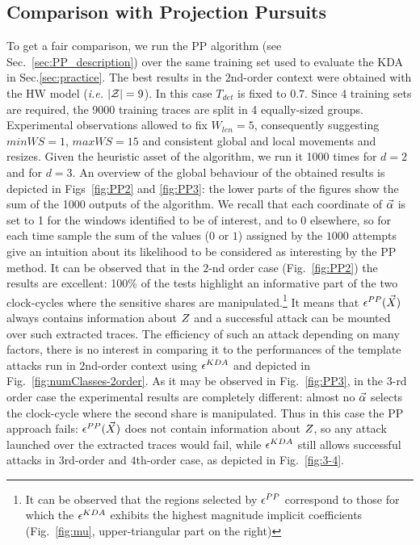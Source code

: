 

\subsection{Comparison with Projection Pursuits}\label{sec:comparisonPP}

To get a fair comparison, we run the PP algorithm (see Sec.~\ref{sec:PP_description}) over the same training set used to evaluate the KDA in Sec.\ref{sec:practice}. The best results in the $2$nd-order context were obtained with the HW model (\emph{i.e.}  $\lvert \mathcal{Z} \rvert=9$). In this case $T_{det}$ is fixed to $0.7$. Since 4 training sets are required, the 9000 training traces are split in 4 equally-sized groups.  Experimental observations allowed to fix  $W_{len}=5$, consequently suggesting $minWS=1$, $maxWS = 15$ and consistent global and local movements and resizes.
 Given the heuristic asset of the algorithm, we run it 1000 times for $d=2$ and for $d=3$. An overview of the global behaviour of the obtained results is depicted in Figs~\ref{fig:PP2} and \ref{fig:PP3}: the lower parts of the figures show the sum of the 1000 outputs of the algorithm.
  We recall that each coordinate of $\vec{\alpha}$ is set to 1 for the windows identified to be of interest, and to 0 elsewhere, so for each time sample the sum of the values ($0$ or $1$) assigned by the $1000$ attempts give an intuition about its likelihood to be considered as interesting by the PP method. It can be observed that in the $2$-nd order case (Fig.~\ref{fig:PP2}) the results are excellent: 100\% of the tests highlight an informative part of the two clock-cycles where the sensitive shares are manipulated.\footnote{It can be observed that the regions selected by $\epsilon^{PP}$ correspond to those for which the $\epsilon^{KDA}$ exhibits the highest magnitude implicit coefficients (Fig.~\ref{fig:mu}, upper-triangular part on the right)}
It means that $\epsilon^{PP}(\vec{X})$ always contains information about $Z$ and a successful attack can be mounted over such extracted traces. The efficiency of such an attack depending on many factors, there is no interest in comparing it to the performances of the template attacks run in $2$nd-order context using $\epsilon^{KDA}$ and depicted in Fig.~\ref{fig:numClasses-2order}.
As it may be observed in Fig.~\ref{fig:PP3}, in the $3$-rd order case the experimental results are completely different: almost no $\vec{\alpha}$ selects the clock-cycle where the second share is manipulated. Thus in this case the PP approach fails: $\epsilon^{PP}(\vec{X})$ does not contain information about $Z$, so any attack launched over the extracted traces would fail, while $\epsilon^{KDA}$ still allows successful attacks in $3$rd-order and $4$th-order case, as depicted in Fig.~\ref{fig:3-4}.\\

